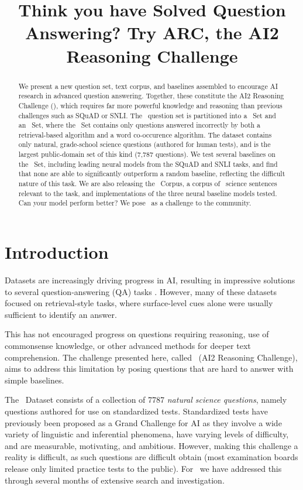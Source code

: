 \title{Think you have Solved Question Answering? Try ARC, the AI2 Reasoning Challenge}

\begin{abstract}
We present a new question set, text corpus, and baselines assembled to encourage AI research in advanced question answering.  Together, these constitute the AI2 Reasoning Challenge (\ASC), which requires far more powerful knowledge and reasoning than previous challenges such as SQuAD or SNLI. The \ASC\  question set is partitioned into a \Challenge~Set and an \Additional~Set, where the \Challenge~Set
contains only questions answered incorrectly by both a retrieval-based algorithm and a word co-occurence algorithm. The dataset contains only natural, grade-school science questions (authored for human tests), and is the largest public-domain set of this kind (7,787 questions). We test several baselines on the \Challenge~Set, including leading neural models from the SQuAD and SNLI tasks, and find that none are able to significantly outperform a random baseline, reflecting the difficult nature of this task. We are also releasing the \ASC~Corpus, a corpus of ~science sentences relevant to the task, and implementations of the three neural baseline models tested. Can your model perform better? We pose \ASC~as a challenge to the community.
\end{abstract}

\section{Introduction}

Datasets are increasingly driving progress in AI, resulting in impressive solutions to several question-answering (QA) tasks \cite[e.g.,][]{rajpurkar2016squad,JoshiTriviaQA2017}.
However, many of these datasets focused on retrieval-style tasks, where surface-level cues alone were usually sufficient to identify an answer.

This has not encouraged progress on questions requiring reasoning, use of commonsense knowledge, or other advanced methods for deeper text comprehension. The challenge presented here, called \ASC~(AI2
Reasoning Challenge), aims to address this limitation by posing questions that are hard to answer with simple baselines.

The \ASC~Dataset consists of a collection of 7787 {\it natural science questions}, namely questions authored for use on standardized tests. Standardized tests have previously been proposed as a Grand Challenge for AI \cite{darpa,aimagazine2016} as they involve a wide variety of linguistic and inferential phenomena, have varying levels of difficulty, and are measurable, motivating, and ambitious. However, making this challenge a reality is difficult, as such questions are difficult obtain (most examination boards release only limited practice tests to the public). For \ASC~we have addressed this through several months of extensive search and investigation.

